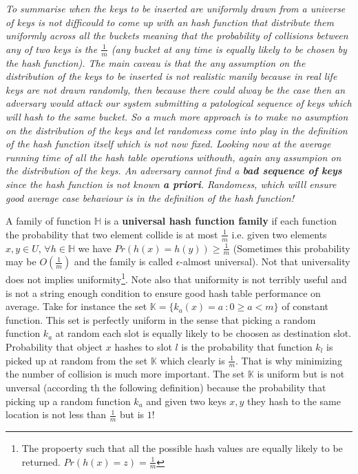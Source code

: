 \textit{To summarise when the keys to be inserted are uniformly drawn from a universe of keys is not difficould to come up with an hash function that distribute them uniformly across all the buckets meaning that the probability of collisions between any of two keys is the $\frac{1}{m}$ (any bucket at any time is equally likely to be chosen by the hash function). The main caveau is that the any assumption on the distribution of the keys to be inserted is not realistic manily because in real life keys are not drawn randomly, then because there could alway be the case then an adversary would attack our system submitting a patological sequence of keys which will hash to the same bucket. So a much more approach is to  make no asumption on the distribution of the keys and let randomess come into play in the definition of the hash function itself which is not now fixed. Looking now at the average running time of all the hash table operations withouth, again any assumpion on the distribution of the keys. An adversary cannot find a \textbf{bad sequence of keys} since the hash function is not known \textbf{a priori}. Randomess, which willl ensure good average case behaviour is in the definition of the hash function!} 

A family of function $\mathbb{H}$ is a  \textbf{universal hash function family} if each function the probability that two element collide is at most $\frac{1}{m}$ i.e. given two elements $x,y \in U$, $\forall h \in \mathbb{H}$ we have $Pr(h(x) = h(y)) \geq \frac{1}{m}$ (Sometimes this probability may be $O(\frac{1}{m})$ and the family is called $\epsilon$-almost universal). Not that universality does not implies uniformity\footnote{The propoerty such that all the possible hash values are equally likely to be returned. $Pr(h(x)=z) = \frac{1}{m}$}. Note also that uniformity is not terribly useful and is not a string enough condition to ensure good hash table performance on average. Take for instance the set $\mathbb{K} = \{ k_a(x) = a \: : 0\geq a<m\}$ of  constant function. This set is perfectly uniform in the sense that picking a random function $k_a$ at random each slot is equally likely to be choosen as destination slot. Probability that object $x$ hashes to slot $l$ is the probability that function $k_l$ is picked up at random from the set $\mathbb{K}$ which clearly is $\frac{1}{m}$. That is why minimizing the number of collision is much more important. The set $\mathbb{K}$ is uniform but is not unversal (according th the following definition) because the probability that picking up a random function $k_a$ and given two keys $x,y$ they hash to the same location is not less than $\frac{1}{m}$ but is $1$!



